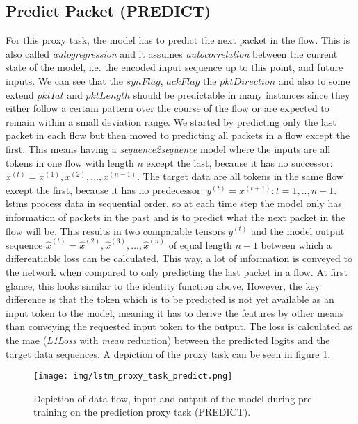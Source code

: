 \subsection{Predict Packet (PREDICT)} \label{sec:experiments:lstm:predict_packet}

For this proxy task, the model has to predict the next packet in the flow. This is also called \textit{autogregression} and it assumes \textit{autocorrelation} between the current state of the model, i.e. the encoded input sequence up to this point, and future inputs. We can see that the $synFlag$, $ackFlag$ the $pktDirection$ and also to some extend $pktIat$ and $pktLength$ should be predictable in many instances since they either follow a certain pattern over the course of the flow or are expected to remain within a small deviation range. We started by predicting only the last packet in each flow but then moved to predicting all packets in a flow except the first. This means having a \textit{sequence2sequence} model where the inputs are all tokens in one flow with length $n$ except the last, because it has no successor: $x^{(t)} = x^{(1)}, x^{(2)}, ..., x^{(n-1)}$. The target data are all tokens in the same flow except the first, because it has no predecessor: $y^{(t)} = x^{(t+1)} : t = 1,..,n-1$. \glspl{lstm} process data in sequential order, so at each time step the model only has information of packets in the past and is to predict what the next packet in the flow will be. This results in two comparable tensors $y^{(t)}$ and the model output sequence $\hat{x}^{(t)} = \hat{x}^{(2)}, \hat{x}^{(3)}, ..., \hat{x}^{(n)}$ of equal length $n-1$ between which a differentiable loss can be calculated. This way, a lot of information is conveyed to the network when compared to only predicting the last packet in a flow. At first glance, this looks similar to the identity function above. However, the key difference is that the token which is to be predicted is not yet available as an input token to the model, meaning it has to derive the features by other means than conveying the requested input token to the output. The loss is calculated as the \gls{mae} (\textit{L1Loss} with \textit{mean} reduction) between the predicted logits and the target data sequences. A depiction of the proxy task can be seen in figure \ref{fig:experiments:lstm_proxy_task_predict}.

\begin{figure}[h]
	\centering
	\texttt{[image: img/lstm\_proxy\_task\_predict.png]}
	\caption{Depiction of data flow, input and output of the model during pre-training on the prediction proxy task (PREDICT). }
	\label{fig:experiments:lstm_proxy_task_predict}
\end{figure}

